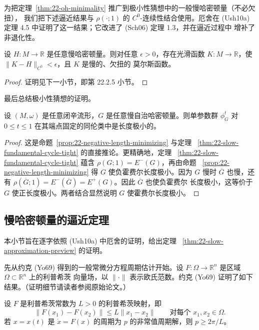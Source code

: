 为把定理~\ref{thm:22-oh-minimality} 推广到极小性猜想中的一般慢哈密顿量（不必欠扭），
我们把下述逼近结果与 $\rho(\mathord\cdot;1)$ 的 $C^0$-连续性结合使用。厄舍在
(Ush10a) 定理 4.5 中证明了这一结果；它改进了 (Sch06) 定理 1.3，并在逼近过程中
增补了非退化性。

\begin{theorem}
\label{thm:22-slow-approximation-preview}
设 $H:M\to\mathbb R$ 是任意慢哈密顿量。则对任意 $\epsilon>0$，存在光滑函数
$K:M\to\mathbb R$，使 $\lVert K-H\rVert_{C^0}<\epsilon$，且 $K$ 是慢的、欠扭的
莫尔斯函数。
\end{theorem}

\begin{proof}
证明见下一小节，即第 22.2.5 小节。
\end{proof}

最后总结极小性猜想的证明。

\begin{theorem}[厄舍 (Ush10a)]
\label{thm:22-usher-minimality}
设 $(M,\omega)$ 是任意闭辛流形，$G$ 是任意慢自治哈密顿量。则单参数群
$\phi_G^t$ 对 $0\leq t\leq1$ 在其端点固定的同伦类中是长度极小的。
\end{theorem}

\begin{proof}
这是命题~\ref{prop:22-negative-length-minimizing} 与定理
~\ref{thm:22-slow-fundamental-cycle-tight} 的直接推论。更精确地，定理
~\ref{thm:22-slow-fundamental-cycle-tight} 蕴含 $\rho(G;1)=E^-(G)$，再由命题
~\ref{prop:22-negative-length-minimizing} 得 $G$ 使负霍费尔长度极小。因为 $G$
慢时 $\overline G$ 也慢，还有
$\rho(\overline G;1)=E^-(\overline G)=E^+(G)$。因此 $\overline G$ 也使负霍费尔
长度极小，这等价于 $G$ 使正长度极小。两者结合显然说明 $G$ 使霍费尔长度极小。
\end{proof}

\subsection{慢哈密顿量的逼近定理}

本小节旨在逐字依照 (Ush10a) 中厄舍的证明，给出定理
~\ref{thm:22-slow-approximation-preview} 的证明。

先从约克 (Yo69) 得到的一般常微分方程周期估计开始。设
$F:\Omega\to\mathbb R^n$ 是区域 $\Omega\subset\mathbb R^n$ 上的利普希茨
向量场，以 $\lVert\mathord\cdot\rVert$ 表示欧氏范数。约克 (Yo69)
证明了如下结果。（证明细节请读者参阅原始论文。）

\begin{theorem}
\label{thm:22-yorke-period-estimate}
设 $F$ 是利普希茨常数为 $L>0$ 的利普希茨映射，即
\begin{equation}
 \lVert F(x_1)-F(x_2)\rVert\leq L\lVert x_1-x_2\rVert
 \qquad\text{对每个 }x_1,x_2\in\Omega.
 \label{eq:22-lipschitz-vector-field}
\end{equation}
若 $x=x(t)$ 是 $\dot x=F(x)$ 的周期为 $p$ 的非常值周期解，则
$p\geq2\pi/L$。
\end{theorem}

